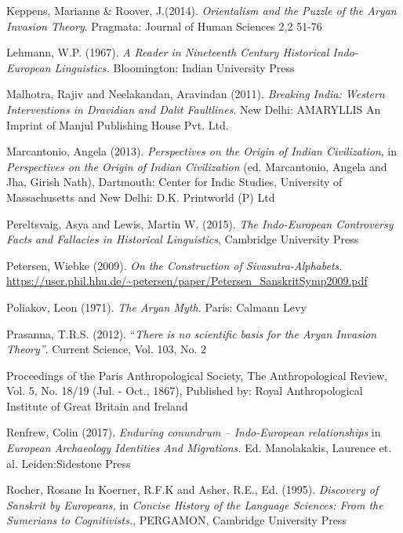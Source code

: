 \begin{thebibliography}{99}
  Keppens, Marianne \& Roover, J.(2014). \textit{Orientalism and the Puzzle of the Aryan Invasion Theory}. Pragmata: Journal of Human Sciences 2,2 51-76

  Lehmann, W.P. (1967). \textit{A Reader in Nineteenth Century Historical Indo-European Linguistics. } Bloomington: Indian University Press

  Malhotra, Rajiv and Neelakandan, Aravindan (2011). \textit{Breaking India: Western Interventions in Dravidian and Dalit Faultlines}. New Delhi: AMARYLLIS An Imprint of Manjul Publishing House Pvt. Ltd.

  Marcantonio, Angela (2013). \textit{Perspectives on the Origin of Indian Civilization}, in \textit{Perspectives on the Origin of Indian Civilization} (ed. Marcantonio, Angela and Jha, Girish Nath), Dartmouth: Center for Indic Studies, University of Massachusetts and New Delhi: D.K. Printworld (P) Ltd

  Pereltsvaig, Asya and Lewis, Martin W. (2015). \textit{The Indo-European Controversy Facts and Fallacies in Historical Linguistics}, Cambridge University Press

  Petersen, Wiebke (2009). \textit{On the Construction of Sivasutra-Alphabets}. \url{https://user.phil.hhu.de/~petersen/paper/Petersen_SanskritSymp2009.pdf}

  Poliakov, Leon (1971). \textit{The Aryan Myth.} Paris: Calmann Levy

  Prasanna, T.R.S. (2012). “\textit{There is no scientific basis for the Aryan Invasion Theory”}. Current Science, Vol. 103, No. 2

  Proceedings of the Paris Anthropological Society, The Anthropological Review, Vol. 5, No. 18/19 (Jul. - Oct., 1867), Published by: Royal Anthropological Institute of Great Britain and Ireland

  Renfrew, Colin (2017). \textit{Enduring conundrum – Indo-European relationships} in \textit{European Archaeology Identities And Migrations.} Ed. Manolakakis, Laurence et. al. Leiden:Sidestone Press

  Rocher, Rosane In Koerner, R.F.K and Asher, R.E., Ed. (1995). \textit{Discovery of Sanskrit by Europeans, }in \textit{Concise History of the Language Sciences: From the Sumerians to Cognitivists.}, PERGAMON, Cambridge University Press


\end{thebibliography}
